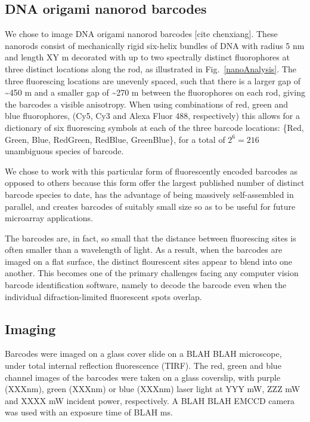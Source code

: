 \subsection{DNA origami nanorod barcodes}
We chose to image DNA origami nanorod barcodes [cite chenxiang]. These nanorods consist of mechanically rigid six-helix bundles of DNA with radius 5 nm and length XY \textmu m decorated with  up to two spectrally distinct fluorophores at three distinct locations along the rod, as illustrated in Fig.~\ref{nanoAnalysis}. The three fluorescing locations are unevenly spaced, such that there is a larger gap of \textasciitilde 450 \textmu m and a smaller gap of \textasciitilde 270 \textmu m  between the fluorophores on each rod, giving the barcodes a visible anisotropy. When using combinations of red, green and blue fluorophores, (Cy5, Cy3 and Alexa Fluor 488, respectively) this allows for a dictionary of six fluorescing symbols at each of the three barcode locations: \{Red, Green, Blue, RedGreen, RedBlue, GreenBlue\}, for a total of $2^{6}=216$  unambiguous species of barcode.

We chose to work with this particular form of fluorescently encoded barcodes as opposed to others because this form offer the largest published number of distinct barcode species to date, has the advantage of being massively self-assembled in parallel, and creates barcodes of suitably small  size so as to be useful for future microarray applications. 

The barcodes are, in fact, so small that the distance between fluorescing sites is often smaller than a wavelength of light. As a result, when the barcodes are imaged on a flat surface, the distinct flourescent sites appear to blend into one another. This becomes one of the primary challenges facing any computer vision barcode identification software, namely to  decode the barcode even when the individual difraction-limited fluorescent spots overlap. 

\subsection{Imaging}
Barcodes were imaged on a glass cover slide on a BLAH BLAH microscope,  under total internal reflection fluorescence (TIRF). 
The red, green and blue channel images of the barcodes were taken on a glass coverslip, with purple (XXXnm), green (XXXnm) or blue (XXXnm) laser light at YYY mW, ZZZ mW and XXXX mW incident power, respectively. A BLAH BLAH EMCCD camera was used with an exposure time of BLAH ms.
 
